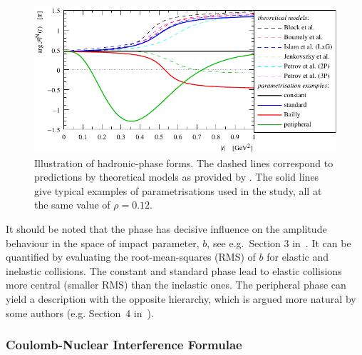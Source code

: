 \begin{figure}
\begin{center}
\includegraphics{fig/hadronic_phase_illustration.pdf}
\caption{Illustration of hadronic-phase forms. The dashed lines correspond to predictions by theoretical models as provided by \cite{elegent}. The solid lines give typical examples of parametrisations used in the study, all at the same value of $\rho = 0.12$.}
\label{fig:phase_illustration}
\end{center}
\end{figure}

It should be noted that the phase has decisive influence on the amplitude behaviour in the space of impact parameter, $b$, see e.g.~Section 3 in~\cite{klk02}. It can be quantified by evaluating the root-mean-squares (RMS) of $b$ for elastic and inelastic collisions. The constant and standard phase lead to elastic collisions more central (smaller RMS) than the inelastic ones. The peripheral phase can yield a description with the opposite hierarchy, which is argued more natural by some authors (e.g. Section~4 in~\cite{kl96}).

\subsubsection{Coulomb-Nuclear Interference Formulae}
\label{sec:cni interference}

